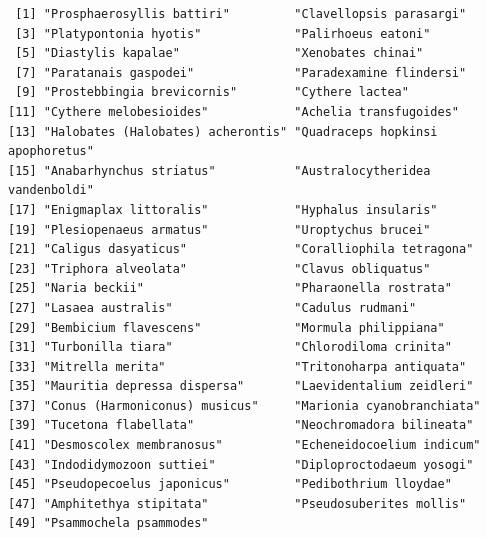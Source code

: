\documentclass[
  letterpaper,
  DIV=11,
  numbers=noendperiod,
  oneside]{scrreprt}
\newenvironment{Shaded}{\begin{snugshade}}{\end{snugshade}}
\newcommand{\AttributeTok}[1]{\textcolor[rgb]{0.40,0.45,0.13}{#1}}
\newcommand{\CommentTok}[1]{\textcolor[rgb]{0.37,0.37,0.37}{#1}}
\newcommand{\ConstantTok}[1]{\textcolor[rgb]{0.56,0.35,0.01}{#1}}
\newcommand{\DecValTok}[1]{\textcolor[rgb]{0.68,0.00,0.00}{#1}}
\newcommand{\FunctionTok}[1]{\textcolor[rgb]{0.28,0.35,0.67}{#1}}
\newcommand{\NormalTok}[1]{\textcolor[rgb]{0.00,0.23,0.31}{#1}}
\newcommand{\OtherTok}[1]{\textcolor[rgb]{0.00,0.23,0.31}{#1}}
\newcommand{\SpecialCharTok}[1]{\textcolor[rgb]{0.37,0.37,0.37}{#1}}
\begin{document}
\begin{verbatim}
 [1] "Prosphaerosyllis battiri"         "Clavellopsis parasargi"          
 [3] "Platypontonia hyotis"             "Palirhoeus eatoni"               
 [5] "Diastylis kapalae"                "Xenobates chinai"                
 [7] "Paratanais gaspodei"              "Paradexamine flindersi"          
 [9] "Prostebbingia brevicornis"        "Cythere lactea"                  
[11] "Cythere melobesioides"            "Achelia transfugoides"           
[13] "Halobates (Halobates) acherontis" "Quadraceps hopkinsi apophoretus" 
[15] "Anabarhynchus striatus"           "Australocytheridea vandenboldi"  
[17] "Enigmaplax littoralis"            "Hyphalus insularis"              
[19] "Plesiopenaeus armatus"            "Uroptychus brucei"               
[21] "Caligus dasyaticus"               "Coralliophila tetragona"         
[23] "Triphora alveolata"               "Clavus obliquatus"               
[25] "Naria beckii"                     "Pharaonella rostrata"            
[27] "Lasaea australis"                 "Cadulus rudmani"                 
[29] "Bembicium flavescens"             "Mormula philippiana"             
[31] "Turbonilla tiara"                 "Chlorodiloma crinita"            
[33] "Mitrella merita"                  "Tritonoharpa antiquata"          
[35] "Mauritia depressa dispersa"       "Laevidentalium zeidleri"         
[37] "Conus (Harmoniconus) musicus"     "Marionia cyanobranchiata"        
[39] "Tucetona flabellata"              "Neochromadora bilineata"         
[41] "Desmoscolex membranosus"          "Echeneidocoelium indicum"        
[43] "Indodidymozoon suttiei"           "Diploproctodaeum yosogi"         
[45] "Pseudopecoelus japonicus"         "Pedibothrium lloydae"            
[47] "Amphitethya stipitata"            "Pseudosuberites mollis"          
[49] "Psammochela psammodes"           
\end{verbatim}

\begin{Shaded}
\end{Shaded}
\end{document}
